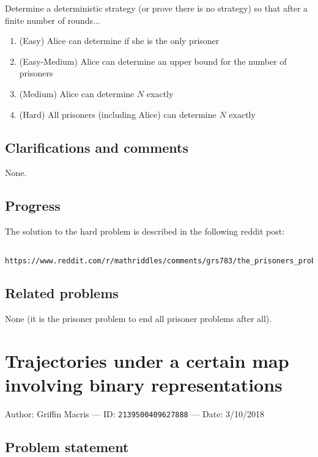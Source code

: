 \documentclass[10pt]{article}
\begin{document}
Determine a deterministic strategy (or prove there is no strategy) so that after a finite number of rounds...

\begin{enumerate}
    \item (Easy) Alice can determine if she is the only prisoner
    \item (Easy-Medium) Alice can determine an upper bound for the number of prisoners
    \item (Medium) Alice can determine $N$ exactly
    \item (Hard) All prisoners (including Alice) can determine $N$ exactly
\end{enumerate}

\subsection{Clarifications and comments}

None.

\subsection{Progress}

The solution to the hard problem is described in the following reddit post:

\begin{verbatim}
  https://www.reddit.com/r/mathriddles/comments/grs783/the_prisoners_problem_to_end_all_prisoners/
\end{verbatim}

\subsection{Related problems}

None (it is the prisoner problem to end all prisoner problems after all).

\pagebreak

\section{Trajectories under a certain map involving binary representations}

Author: Griffin Macris --- ID: \verb`2139500409627888` --- Date: 3/10/2018

\subsection{Problem statement}
\end{document}
